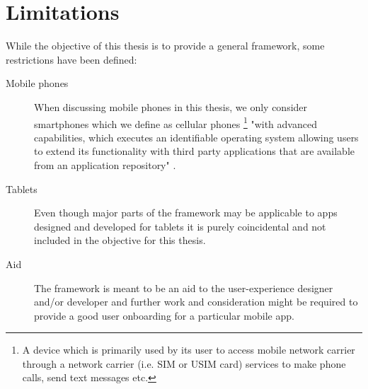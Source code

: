 \section{Limitations}
While the objective of this thesis is to provide a general framework, some restrictions have been defined:
\begin{description}
  \item[Mobile phones] When discussing mobile phones in this thesis, we only consider smartphones which we define as cellular phones \footnote{A device which is primarily used by its user to access mobile network carrier through a network carrier (i.e. SIM or USIM card) services to make phone calls, send text messages etc.} "with advanced capabilities, which executes an identifiable operating system allowing users to extend its functionality with third party applications that are available from an application repository" \cite{Theoharidou2012}.
  \item[Tablets] Even though major parts of the framework may be applicable to apps designed and developed for tablets it is purely coincidental and not included in the objective for this thesis.
  \item[Aid] The framework is meant to be an aid to the user-experience designer and/or developer and further work and consideration might be required to provide a good user onboarding for a particular mobile app.
\end{description}

